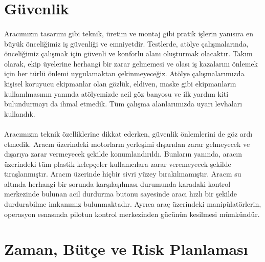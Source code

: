 \documentclass[12pt]{article}
\begin{document}
\section{Güvenlik}

\begin{justify}
\paragraph{} Aracımızın tasarımı gibi teknik, üretim ve montaj gibi pratik işlerin yanısıra en büyük önceliğimiz iş güvenliği ve emniyetdir. Testlerde, atölye çalışmalarında, önceliğimiz çalışmak için güvenli ve konforlu alanı oluşturmak olacaktır. Takım olarak, ekip üyelerine herhangi bir zarar gelmemesi ve olası iş kazalarını önlemek için her türlü önlemi uygulamaktan çekinmeyeceğiz.
Atölye çalışmalarımızda kişisel koruyucu ekipmanlar olan gözlük, eldiven, maske gibi ekipmanların kullanılmasının yanında atölyemizde acil göz banyosu ve ilk yardım kiti bulundurmayı da ihmal etmedik. Tüm çalışma alanlarımızda uyarı levhaları kullandık.
\end{justify}
\begin{justify}
\paragraph{} Aracımızın teknik özelliklerine dikkat ederken, güvenlik önlemlerini de göz ardı etmedik. Aracın üzerindeki motorların yerleşimi dışarıdan zarar gelmeyecek ve dışarıya zarar vermeyecek şekilde konumlandırıldı. Bunların yanında, aracın üzerindeki tüm plastik kelepçeler kullanıcılara zarar veremeyecek şekilde tıraşlanmıştır. Aracın üzerinde hiçbir sivri yüzey bırakılmamıştır. Aracın su altında herhangi bir sorunda karşılaşılması durumunda karadaki kontrol merkezinde bulunan acil durdurma butonu sayesinde aracı hızlı bir şekilde durdurabilme imkanımız bulunmaktadır. Ayrıca araç üzerindeki manipülatörlerin, operasyon esnasında pilotun kontrol merkezinden gücünün kesilmesi mümkündür.
\end{justify}

\section{Zaman, Bütçe ve Risk Planlaması}

\end{document}
